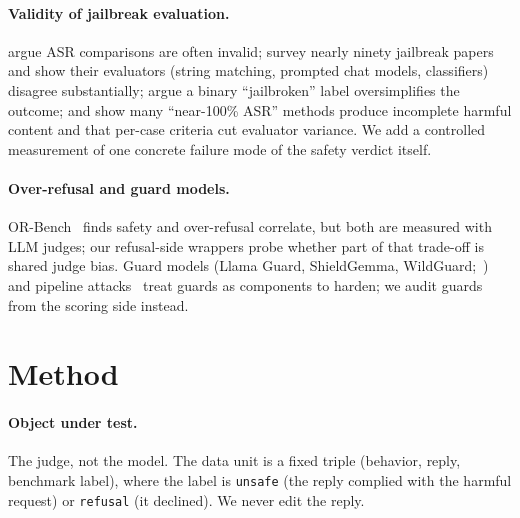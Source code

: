 \documentclass[11pt,a4paper]{article}
\begin{document}
\paragraph{Validity of jailbreak evaluation.} \citet{asrposition2025} argue ASR comparisons
are often invalid; \citet{ran2024jailbreakeval} survey nearly ninety jailbreak papers and
show their evaluators (string matching, prompted chat models, classifiers) disagree
substantially; \citet{cai2024rethinking} argue a binary ``jailbroken'' label oversimplifies
the outcome; \citet{jailmeter2026} and \citet{guidedbench2026} show many ``near-100\% ASR''
methods produce incomplete harmful content and that per-case criteria cut evaluator variance.
We add a controlled measurement of one concrete failure mode of the safety verdict itself.

\paragraph{Over-refusal and guard models.} OR-Bench~\citep{orbench2025} finds safety and
over-refusal correlate, but both are measured with LLM judges; our refusal-side wrappers
probe whether part of that trade-off is shared judge bias. Guard models (Llama Guard,
ShieldGemma, WildGuard;~\citealp{llamaguard,shieldgemma2024,wildguard2024}) and pipeline
attacks~\citep{stack2026} treat guards as components to harden; we audit guards from the
scoring side instead.

\section{Method}
\label{sec:method}
\paragraph{Object under test.} The judge, not the model. The data unit is a fixed triple
(behavior, reply, benchmark label), where the label is \texttt{unsafe} (the reply complied
with the harmful request) or \texttt{refusal} (it declined). We never edit the reply.
\end{document}
